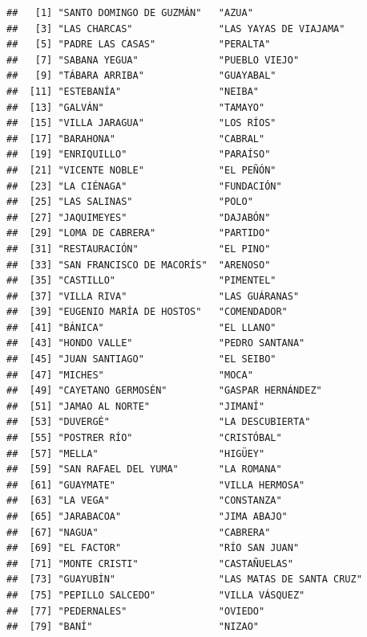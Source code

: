 \documentclass[11pt,]{article}
\begin{document}
\begin{verbatim}
##   [1] "SANTO DOMINGO DE GUZMÁN"   "AZUA"                     
##   [3] "LAS CHARCAS"               "LAS YAYAS DE VIAJAMA"     
##   [5] "PADRE LAS CASAS"           "PERALTA"                  
##   [7] "SABANA YEGUA"              "PUEBLO VIEJO"             
##   [9] "TÁBARA ARRIBA"             "GUAYABAL"                 
##  [11] "ESTEBANÍA"                 "NEIBA"                    
##  [13] "GALVÁN"                    "TAMAYO"                   
##  [15] "VILLA JARAGUA"             "LOS RÍOS"                 
##  [17] "BARAHONA"                  "CABRAL"                   
##  [19] "ENRIQUILLO"                "PARAÍSO"                  
##  [21] "VICENTE NOBLE"             "EL PEÑÓN"                 
##  [23] "LA CIÉNAGA"                "FUNDACIÓN"                
##  [25] "LAS SALINAS"               "POLO"                     
##  [27] "JAQUIMEYES"                "DAJABÓN"                  
##  [29] "LOMA DE CABRERA"           "PARTIDO"                  
##  [31] "RESTAURACIÓN"              "EL PINO"                  
##  [33] "SAN FRANCISCO DE MACORÍS"  "ARENOSO"                  
##  [35] "CASTILLO"                  "PIMENTEL"                 
##  [37] "VILLA RIVA"                "LAS GUÁRANAS"             
##  [39] "EUGENIO MARÍA DE HOSTOS"   "COMENDADOR"               
##  [41] "BÁNICA"                    "EL LLANO"                 
##  [43] "HONDO VALLE"               "PEDRO SANTANA"            
##  [45] "JUAN SANTIAGO"             "EL SEIBO"                 
##  [47] "MICHES"                    "MOCA"                     
##  [49] "CAYETANO GERMOSÉN"         "GASPAR HERNÁNDEZ"         
##  [51] "JAMAO AL NORTE"            "JIMANÍ"                   
##  [53] "DUVERGÉ"                   "LA DESCUBIERTA"           
##  [55] "POSTRER RÍO"               "CRISTÓBAL"                
##  [57] "MELLA"                     "HIGÜEY"                   
##  [59] "SAN RAFAEL DEL YUMA"       "LA ROMANA"                
##  [61] "GUAYMATE"                  "VILLA HERMOSA"            
##  [63] "LA VEGA"                   "CONSTANZA"                
##  [65] "JARABACOA"                 "JIMA ABAJO"               
##  [67] "NAGUA"                     "CABRERA"                  
##  [69] "EL FACTOR"                 "RÍO SAN JUAN"             
##  [71] "MONTE CRISTI"              "CASTAÑUELAS"              
##  [73] "GUAYUBÍN"                  "LAS MATAS DE SANTA CRUZ"  
##  [75] "PEPILLO SALCEDO"           "VILLA VÁSQUEZ"            
##  [77] "PEDERNALES"                "OVIEDO"                   
##  [79] "BANÍ"                      "NIZAO"                    

\end{verbatim}
\end{document}
